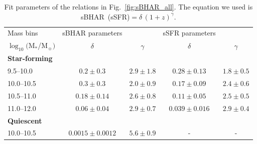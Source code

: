 \begin{table}
\caption{Fit parameters of the relations in Fig.~\ref{fig:sBHAR_all}. The equation we used is sBHAR~(sSFR)$=\delta\, (1 +z)^{\gamma}$.}             %
\label{table:specific_fitpar}      %
\centering                          %
\begin{tabular}{l | c c | c c }        %
\hline\hline                 %
Mass bins                   & sBHAR parameters      &                 & sSFR parameters     &                 \\
$\log_{10}($M$_*$/M$_\sun)$ & $\delta$              &  $\gamma$       & $\delta$            &  $\gamma$       \\
\hline                                                                                                  
\textbf{Star-forming}       &                       &                 &                     &                 \\
 9.5--10.0                  & $ 0.2  \pm 0.3  $     & $ 2.9 \pm 1.8 $ & $ 0.28 \pm 0.13 $   & $ 1.8 \pm 0.5 $ \\
10.0--10.5                  & $ 0.3  \pm 0.3  $     & $ 2.0 \pm 0.9 $ & $ 0.17 \pm 0.09 $   & $ 2.4 \pm 0.6 $ \\
10.5--11.0                  & $ 0.18 \pm 0.14 $     & $ 2.6 \pm 0.8 $ & $ 0.11 \pm 0.05 $   & $ 2.5 \pm 0.5 $ \\
11.0--12.0                  & $ 0.06 \pm 0.04 $     & $ 2.9 \pm 0.7 $ & $ 0.039\pm 0.016$   & $ 2.9 \pm 0.4 $ \\
\hline
\textbf{Quiescent}          &                       &                 &                     &                 \\
10.0--10.5                  & $ 0.0015 \pm 0.0012 $ & $ 5.6 \pm 0.9 $ & -                   & -               \\

\end{tabular}
\end{table}
